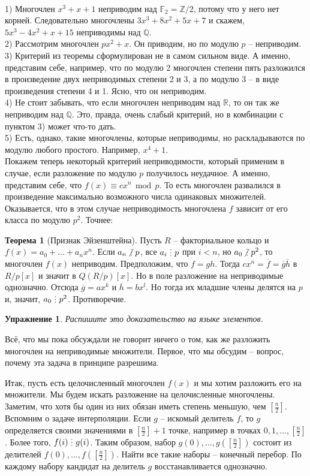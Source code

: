 \documentclass[10pt,a4paper,oneside]{book}
\newtheorem{uprz}{\color{violet!100!black} Упражнение}
\theoremstyle{definition}
\newtheorem{thm}{\color{red!40!black}Теорема}
\renewcommand{\mod}{\,\operatorname{mod}\,}
\newcommand{\mb}[1]{\mathbb{#1}}
\newcommand{\ovl}{\overline}
\newcommand{\di}{\mathop{\,\scalebox{0.85}{\raisebox{-1.2pt}[0.5\height]{\vdots}}\,}}
\newcommand{\ndi}{\mathop{\not\scalebox{0.85}{\raisebox{-1.2pt}[0.5\height]{\vdots}}\,}}
\def\exm{\noindent {\bf Примеры:}}
\def\thrm{\begin{thm}}
\def\ethrm{\end{thm}}
\def\upr{\begin{uprz}}
\def\eupr{\end{uprz}}
\begin{document}
\exm\\
1) Многочлен $x^3+x+1$ неприводим над $\mb F_2=\mb Z/2$, потому что у него нет корней. Следовательно многочлены $3x^3+8x^2+5x+7$ и скажем, $5x^3-4x^2+x+15$ неприводимы над $\mb Q$.\\
2) Рассмотрим многочлен $px^2+x$. Он приводим, но по модулю $p$ -- неприводим.\\
3) Критерий из теоремы сформулирован не в самом сильном виде. А именно, представим себе, например, что по модулю 2 многочлен степени пять разложился в произведение двух неприводимых степени 2 и 3, а по модулю 3 -- в виде произведения степени 4 и 1. Ясно, что он неприводим.\\
4) Не стоит забывать, что если многочлен неприводим над $\mb R$, то он так же неприводим над $\mb Q$. Это, правда, очень слабый критерий, но в комбинации с пунктом 3) может что-то дать.\\
5) Есть, однако, такие многочлены, которые неприводимы, но раскладываются по модулю любого простого. Например, $x^4+1$.\\


Покажем теперь некоторый критерий неприводимости, который применим в случае, если разложение по модулю $p$ получилось неудачное. А именно, представим себе, что $f(x) \equiv c x^n \mod p$. То есть многочлен развалился в произведение максимально возможного числа одинаковых множителей. Оказывается, что в этом случае неприводимость многочлена $f$ зависит от его класса по модулю $p^2$. Точнее:

\thrm[Признак Эйзенштейна] Пусть $R$ -- факториальное кольцо и $f(x)= a_0 + \dots + a_n x^n$. Если $a_n \ndi p$, все $a_i \di p$ при $i<n$, но $a_0\ndi p^2$, то многочлен $f(x)$ неприводим.
\proof
Предположим, что $f=gh$. Тогда $c x^n=\ovl{f}=\ovl{g}\ovl{h}$ в $R/p[x]$ и значит в $Q(R/p)[x]$. Но в поле разложение на неприводимые однозначно. Отсюда $\ovl{g}=ax^k$ и $\ovl{h}=b x^l$. Но тогда их младшие члены делятся на $p$ и, значит, $a_0\di p^2$. Противоречие. 
\endproof
\ethrm 

\upr Распишите это доказательство на языке элементов.
\eupr

Всё, что мы пока обсуждали не говорит ничего о том, как же разложить многочлен на неприводимые множители. Первое, что мы обсудим -- вопрос, почему эта задача в принципе разрешима.

Итак, пусть есть целочисленный многочлен $f(x)$ и мы хотим разложить его на множители. Мы будем искать разложение на целочисленные многочлены. Заметим, что хотя бы один из них обязан иметь степень меньшую, чем $[\frac{n}{2}]$. Вспомним о задаче интерполяции. Если $g$ -- искомый делитель $f$, то $g$ определяется своими значениями в $[\frac{n}{2}]+1$ точке, например в точках $0,1,\dots, [\frac{n}{2}]$. Более того, $f(i) \di g(i)$. Таким образом, набор $g(0),\dots, g([\frac{n}{2}])$ состоит из делителей $f(0),\dots,f([\frac{n}{2}])$. Найти все такие наборы -- конечный перебор. По каждому набору кандидат на делитель $g$ восстанавливается однозначно.
\end{document}

